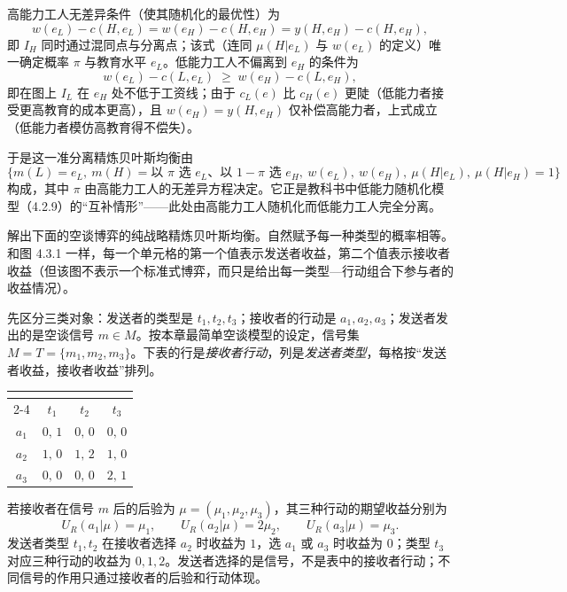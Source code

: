 高能力工人无差异条件（使其随机化的最优性）为
\[
  w(e_L)-c(H,e_L)=w(e_H)-c(H,e_H)=y(H,e_H)-c(H,e_H),
\]\indent
即 $I_H$ 同时通过混同点与分离点；该式（连同 $\mu(H|e_L)$ 与 $w(e_L)$ 的定义）唯一确定概率 $\pi$ 与教育水平 $e_L$。低能力工人不偏离到 $e_H$ 的条件为
\[
  w(e_L)-c(L,e_L)\;\ge\; w(e_H)-c(L,e_H),
\]\indent
即在图上 $I_L$ 在 $e_H$ 处不低于工资线；由于 $c_L(e)$ 比 $c_H(e)$ 更陡（低能力者接受更高教育的成本更高），且 $w(e_H)=y(H,e_H)$ 仅补偿高能力者，上式成立（低能力者模仿高教育得不偿失）。

于是这一准分离精炼贝叶斯均衡由
\[
  \bigl\{m(L)=e_L,\ m(H)=\text{以 }\pi\text{ 选 }e_L\text{、以 }1-\pi\text{ 选 }e_H,\ 
  w(e_L),\ w(e_H),\ \mu(H|e_L),\ \mu(H|e_H)=1\bigr\}
\]\indent
构成，其中 $\pi$ 由高能力工人的无差异方程决定。它正是教科书中低能力随机化模型（4.2.9）的“互补情形”——此处由高能力工人随机化而低能力工人完全分离。

\exer{4.8}
解出下面的空谈博弈的纯战略精炼贝叶斯均衡。自然赋予每一种类型的概率相等。和图 4.3.1 一样，每一个单元格的第一个值表示发送者收益，第二个值表示接收者收益（但该图不表示一个标准式博弈，而只是给出每一类型—行动组合下参与者的收益情况）。

\sol 先区分三类对象：发送者的类型是 $t_1,t_2,t_3$；接收者的行动是 $a_1,a_2,a_3$；发送者发出的是空谈信号 $m\in M$。按本章最简单空谈模型的设定，信号集 $M=T=\{m_1,m_2,m_3\}$。下表的行是\emph{接收者行动}，列是\emph{发送者类型}，每格按“发送者收益，接收者收益”排列。

\begin{paytab}
\begin{tabular}{cccc}
 & \multicolumn{3}{c}{\pthead{发送者类型}}\\
\cline{2-4}
\pthead{接收者行动} & $t_1$ & $t_2$ & $t_3$\\[2pt]
\hline
$a_1$ & $0,\,1$ & $0,\,0$ & $0,\,0$\\[4pt]
\hline
$a_2$ & $1,\,0$ & $1,\,2$ & $1,\,0$\\[4pt]
\hline
$a_3$ & $0,\,0$ & $0,\,0$ & $2,\,1$\\[4pt]
\hline
\end{tabular}
\end{paytab}

若接收者在信号 $m$ 后的后验为 $\mu=(\mu_1,\mu_2,\mu_3)$，其三种行动的期望收益分别为
\[
  U_R(a_1|\mu)=\mu_1,\qquad U_R(a_2|\mu)=2\mu_2,\qquad U_R(a_3|\mu)=\mu_3.
\]\indent
发送者类型 $t_1,t_2$ 在接收者选择 $a_2$ 时收益为 $1$，选 $a_1$ 或 $a_3$ 时收益为 $0$；类型 $t_3$ 对应三种行动的收益为 $0,1,2$。发送者选择的是信号，不是表中的接收者行动；不同信号的作用只通过接收者的后验和行动体现。


